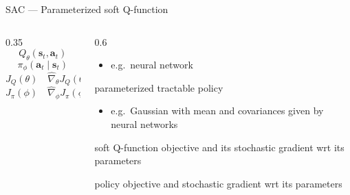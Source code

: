 \begin{frame}{SAC --- Parameterized soft Q-function}
\begin{columns}[T]
\begin{column}{0.35\textwidth}
\vspace{0.3em}
\[ Q_\theta(\mathbf{s}_t, \mathbf{a}_t) \]
\vspace{0.5em}
\[ \pi_\phi(\mathbf{a}_t \mid \mathbf{s}_t) \]
\vspace{1em}
\[ J_Q(\theta) \quad \hat{\nabla}_\theta J_Q(\theta) \]
\vspace{0.5em}
\[ J_\pi(\phi) \quad \hat{\nabla}_\phi J_\pi(\phi) \]
\end{column}
\begin{column}{0.6\textwidth}
\begin{itemize}
    \item[$\bullet$] e.g.\ neural network
\end{itemize}
\vspace{0.3em}
parameterized tractable policy
\begin{itemize}
    \item[$\bullet$] e.g.\ Gaussian with mean and covariances given by neural networks
\end{itemize}
\vspace{0.3em}
soft Q-function objective and its stochastic gradient wrt its parameters
\vspace{0.3em}

policy objective and stochastic gradient wrt its parameters
\end{column}
\end{columns}
\end{frame}

